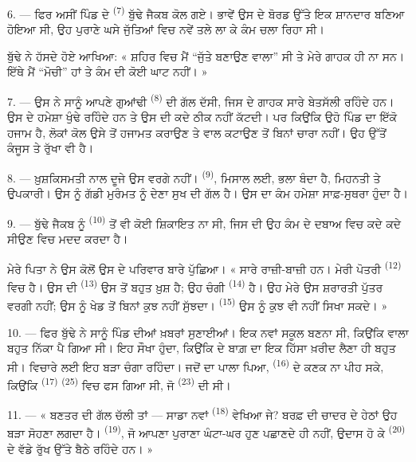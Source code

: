6. --- ਫਿਰ ਅਸੀਂ ਪਿੰਡ ਦੇ  \textsuperscript{(7)} ਬੁੱਢੇ ਜੈਕਬ ਕੋਲ ਗਏ।
ਭਾਵੇਂ ਉਸ ਦੇ ਬੋਰਡ ਉੱਤੇ ਇਕ ਸ਼ਾਨਦਾਰ  ਬਣਿਆ ਹੋਇਆ ਸੀ, ਉਹ ਪੁਰਾਣੇ ਘਸੇ
ਜੁੱਤਿਆਂ ਵਿਚ ਨਵੇਂ ਤਲੇ ਲਾ ਕੇ ਕੰਮ ਚਲਾ ਰਿਹਾ ਸੀ।

ਬੁੱਢੇ ਨੇ ਹੱਸਦੇ ਹੋਏ ਆਖਿਆ: « ਸ਼ਹਿਰ ਵਿਚ ਮੈਂ “ਜੁੱਤੇ ਬਣਾਉਣ ਵਾਲਾ” ਸੀ ਤੇ ਮੇਰੇ ਗਾਹਕ
ਹੀ ਨਾ ਸਨ। ਇੱਥੇ ਮੈਂ “ਮੋਚੀ” ਹਾਂ ਤੇ ਕੰਮ ਦੀ ਕੋਈ ਘਾਟ ਨਹੀਂ। »

7. --- ਉਸ ਨੇ ਸਾਨੂੰ ਆਪਣੇ ਗੁਆਂਢੀ  \textsuperscript{(8)} ਦੀ ਗੱਲ ਦੱਸੀ,
ਜਿਸ ਦੇ ਗਾਹਕ ਸਾਰੇ ਬੇਤਸੱਲੀ ਰਹਿੰਦੇ ਹਨ। ਉਸ ਦੇ  ਹਮੇਸ਼ਾ ਖੁੰਢੇ ਰਹਿੰਦੇ ਹਨ
ਤੇ ਉਸ ਦੀ  ਕਦੇ ਠੀਕ ਨਹੀਂ ਕੱਟਦੀ। ਪਰ ਕਿਉਂਕਿ ਉਹੋ ਪਿੰਡ ਦਾ ਇੱਕੋ ਹਜਾਮ ਹੈ,
ਲੋਕਾਂ ਕੋਲ ਉਸੇ ਤੋਂ ਹਜਾਮਤ ਕਰਾਉਣ ਤੇ ਵਾਲ ਕਟਾਉਣ ਤੋਂ ਬਿਨਾਂ ਚਾਰਾ ਨਹੀਂ। ਉਹ ਉੱਤੋਂ ਕੰਜੂਸ
ਤੇ ਰੁੱਖਾ ਵੀ ਹੈ।

8. --- ਖ਼ੁਸ਼ਕਿਸਮਤੀ ਨਾਲ ਦੂਜੇ  ਉਸ ਵਰਗੇ ਨਹੀਂ।
 \textsuperscript{(9)}, ਮਿਸਾਲ ਲਈ, ਭਲਾ ਬੰਦਾ ਹੈ, ਮਿਹਨਤੀ ਤੇ
ਉਪਕਾਰੀ। ਉਸ ਨੂੰ ਗੱਡੀ ਮੁਰੰਮਤ ਨੂੰ ਦੇਣਾ ਸੁਖ ਦੀ ਗੱਲ ਹੈ। ਉਸ ਦਾ ਕੰਮ ਹਮੇਸ਼ਾ ਸਾਫ਼-ਸੁਥਰਾ
ਹੁੰਦਾ ਹੈ।

9. --- ਬੁੱਢੇ ਜੈਕਬ ਨੂੰ  \textsuperscript{(10)} ਤੋਂ ਵੀ ਕੋਈ ਸ਼ਿਕਾਇਤ
ਨਾ ਸੀ, ਜਿਸ ਦੀ ਉਹ ਕੰਮ ਦੇ ਦਬਾਅ ਵਿਚ ਕਦੇ ਕਦੇ  ਸੀਉਣ ਵਿਚ ਮਦਦ ਕਰਦਾ ਹੈ।

ਮੇਰੇ ਪਿਤਾ ਨੇ ਉਸ ਕੋਲੋਂ ਉਸ ਦੇ ਪਰਿਵਾਰ ਬਾਰੇ ਪੁੱਛਿਆ। « ਸਾਰੇ ਰਾਜ਼ੀ-ਬਾਜ਼ੀ ਹਨ। ਮੇਰੀ
ਪੋਤਰੀ  \textsuperscript{(12)} ਵਿਚ ਹੈ। ਉਸ ਦੀ 
\textsuperscript{(13)} ਉਸ ਤੋਂ ਬਹੁਤ ਖ਼ੁਸ਼ ਹੈ; ਉਹ ਚੰਗੀ 
\textsuperscript{(14)} ਹੈ। ਉਹ ਮੇਰੇ ਉਸ ਸ਼ਰਾਰਤੀ ਪੁੱਤਰ ਵਰਗੀ ਨਹੀਂ; ਉਸ ਨੂੰ ਖੇਡ ਤੋਂ
ਬਿਨਾਂ ਕੁਝ ਨਹੀਂ ਸੁੱਝਦਾ।  \textsuperscript{(15)} ਉਸ ਨੂੰ ਕੁਝ ਵੀ
ਨਹੀਂ ਸਿਖਾ ਸਕਦੇ। »

\VUsaut{3.0mm}
\VUsaut{3.0mm}

10. --- ਫਿਰ ਬੁੱਢੇ ਨੇ ਸਾਨੂੰ ਪਿੰਡ ਦੀਆਂ ਖ਼ਬਰਾਂ ਸੁਣਾਈਆਂ। ਇਕ ਨਵਾਂ ਸਕੂਲ ਬਣਨਾ ਸੀ,
ਕਿਉਂਕਿ  ਵਾਲਾ ਬਹੁਤ ਨਿੱਕਾ ਪੈ ਗਿਆ ਸੀ। ਇਹ ਸੌਖਾ ਹੁੰਦਾ, ਕਿਉਂਕਿ
 ਦੇ ਬਾਗ਼ ਦਾ ਇਕ ਹਿੱਸਾ ਖ਼ਰੀਦ ਲੈਣਾ ਹੀ ਬਹੁਤ ਸੀ। ਵਿਚਾਰੇ ਲਈ ਇਹ ਬੜਾ
ਚੰਗਾ ਰਹਿੰਦਾ। ਜਦੋਂ ਦਾ ਪਾਲਾ ਪਿਆ,  \textsuperscript{(16)} ਦੇ
 ਕਣਕ ਨਾ ਪੀਹ ਸਕੇ, ਕਿਉਂਕਿ  \textsuperscript{(17)}
 \textsuperscript{(25)} ਵਿਚ ਫਸ ਗਿਆ ਸੀ, ਜੋ 
\textsuperscript{(23)} ਦੀ ਸੀ।

11. --- « ਬਣਤਰ ਦੀ ਗੱਲ ਚੱਲੀ ਤਾਂ — ਸਾਡਾ ਨਵਾਂ  \textsuperscript{(18)}
ਵੇਖਿਆ ਜੇ? ਬਰਫ਼ ਦੀ ਚਾਦਰ ਦੇ ਹੇਠਾਂ ਉਹ ਬੜਾ ਸੋਹਣਾ ਲਗਦਾ ਹੈ। 
\textsuperscript{(19)}, ਜੋ ਆਪਣਾ ਪੁਰਾਣਾ ਘੰਟਾ-ਘਰ ਹੁਣ ਪਛਾਣਦੇ ਹੀ ਨਹੀਂ, ਉਦਾਸ ਹੋ ਕੇ
 \textsuperscript{(20)} ਦੇ ਵੱਡੇ ਰੁੱਖ ਉੱਤੇ ਬੈਠੇ ਰਹਿੰਦੇ ਹਨ। »

